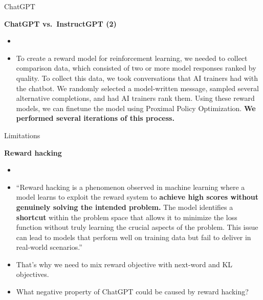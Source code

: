 \begin{vbframe}{ChatGPT}

\vfill

\textbf{ChatGPT vs.\ InstructGPT (2)}

	\begin{itemize}
		\item \href{https://openai.com/blog/chatgpt}{}
		\item
To create a reward model for reinforcement learning, we
		needed to collect comparison data, which
		consisted of two or more model responses
		ranked by quality. To collect this data, we
		took conversations that AI trainers had with
		the chatbot. We randomly selected a
		model-written message, sampled several
		alternative completions, and had AI trainers
		rank them. Using these reward models, we can
		finetune the model using Proximal Policy
		Optimization. \textbf{We performed several
		iterations of this process.}
	\end{itemize}

\vfill

\end{vbframe}


\begin{vbframe}{Limitations}

\vfill

\textbf{Reward hacking}

	\begin{itemize}
		\item \href{https://medium.com/@prdeepak.babu/reward-hacking-in-large-language-models-llms-c57abbc0cde7}{}
		\item
``Reward hacking is a phenomenon observed in machine
		learning where a model learns to exploit the
		reward system to \textbf{achieve high scores without
		genuinely solving the intended problem.} The
		model identifies a \textbf{shortcut} within the
		problem space that allows it to minimize the
		loss function without truly learning the
		crucial aspects of the problem. This issue
		can lead to models that perform well on
		training data but fail to deliver in
		real-world scenarios.''
                \item That's why we need to mix reward
		objective with next-word and KL objectives.
\item \ques What negative property of ChatGPT
		could be caused by reward hacking?

	\end{itemize}

\vfill

\end{vbframe}


